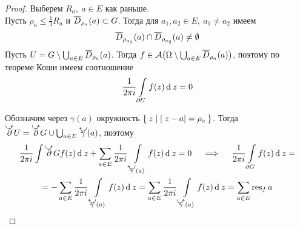 \begin{proof}
	Выберем $ R_a, ~ a \in E $ как раньше. \\
	Пусть $ \rho_a \le \frac13 R_a $ и $ \overline D_{\rho_a}(a) \subset G $. Тогда для $ a_1, a_2 \in E, ~ a_1 \ne a_2 $ имеем
	$$ \overline D_{\rho_{a_1}}(a) \cap \overline D_{\rho_{a_2}}(a) \ne \emptyset $$
	Пусть $ U = G \setminus \bigcup_{a \in E} \overline D_{\rho_a}(a) $.
	Тогда $ f \in \mathcal A \big( \Omega \setminus \bigcup_{a \in E} \overline D_{\rho_a}(a) \big) $, поэтому по теореме Коши имеем соотношение
	$$ \frac1{2\pi i} \int\limits_{\partial U} f(z) \operatorname{d}^{} z = 0 $$

	Обозначим через $ \gamma(a) $ окружность $ \Set{z \mid |z - a| = \rho_a} $. Тогда $ \curvedir \partial U = \curvedir \partial G \cup \bigcup_{a \in E} \curvedir[0] \gamma(a) $, поэтому
	\begin{multline*}
		\frac1{2\pi i} \int\limits{\curvedir\partial G} f(z) \di z + \sum_{a \in E} 	\frac1{2\pi i} \int\limits_{\curvedir[0]\gamma(a)} f(z) \di z = 0 \quad \implies \quad \frac1{2\pi i} \int\limits_{\partial G} f(z) \di z = \\
		= - \sum_{a \in E} \frac1{2\pi i} \int\limits_{\curvedir[0]\gamma(a)} f(z) \di z = \sum_{a \in E} \frac1{2\pi i} \int\limits_{\curvedir \gamma(a)} f(z) \di z = \sum_{a \in E} \res_f a
	\end{multline*}
\end{proof}

